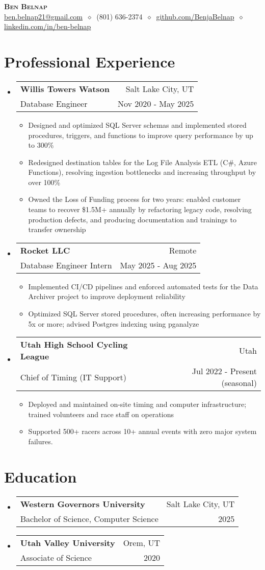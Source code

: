 \documentclass[letterpaper,11pt]{article}
\makeatletter
\newcommand{\cvitem}[1]{
  \item\small{
    {#1\vspace{-2pt}}
  }
}
\newcommand{\cvheading}[4]{
  \vspace{-2pt}\item
    \begin{tabular*}{\textwidth}[t]{l@{\extracolsep{\fill}}r}
      \textbf{#1} & #2 \\
      \small#3 & \small #4 \\
    \end{tabular*}\vspace{-7pt}
}
\newcommand{\cvheadingstart}{\begin{itemize}[leftmargin=0in, label={}]}
\newcommand{\cvheadingend}{\end{itemize}}
\newcommand{\cvitemstart}{\begin{itemize}[label=\textopenbullet]\justifying}
\newcommand{\cvitemend}{\end{itemize}\vspace{-5pt}}
\makeatother
\begin{document}
\begin{center}
  \textbf{\LARGE\scshape Ben Belnap} \\
  \vspace{1pt}\small
  \href{mailto:ben.belnap21@gmail.com}{ben.belnap21@gmail.com}
  $\ \diamond\ $ 
  (801) 636-2374
  $\ \diamond\ $
  \href{https://github.com/BenjaBelnap}{github.com/BenjaBelnap}
  $\ \diamond\ $
  \href{https://www.linkedin.com/in/ben-belnap}{linkedin.com/in/ben-belnap}
\end{center}

\section{Professional Experience}
\cvheadingstart
  \cvheading
    {Willis Towers Watson}{Salt Lake City, UT}
    {Database Engineer}{Nov 2020 - May 2025}
  \cvitemstart
  \cvitem{Designed and optimized SQL Server schemas and implemented stored procedures, triggers, and functions to improve query performance by up to 300\%}
  \cvitem{Redesigned destination tables for the Log File Analysis ETL (C\#, Azure Functions), resolving ingestion bottlenecks and increasing throughput by over 100\%}
  \cvitem{Owned the Loss of Funding process for two years: enabled customer teams to recover \$1.5M+ annually by refactoring legacy code, resolving production defects, and producing documentation and trainings to transfer ownership}
  \cvitemend

  \cvheading
    {Rocket LLC}{Remote}
    {Database Engineer Intern}{May 2025 - Aug 2025}
  \cvitemstart
  \cvitem{Implemented CI/CD pipelines and enforced automated tests for the Data Archiver project to improve deployment reliability}
  \cvitem{Optimized SQL Server stored procedures, often increasing performance by 5x or more; advised Postgres indexing using pganalyze}
  \cvitemend

  \cvheading
    {Utah High School Cycling League}{Utah}
    {Chief of Timing (IT Support)}{Jul 2022 - Present (seasonal)}
  \cvitemstart
  \cvitem{Deployed and maintained on-site timing and computer infrastructure; trained volunteers and race staff on operations}
  \cvitem{Supported 500+ racers across 10+ annual events with zero major system failures.}
  \cvitemend
\cvheadingend

\section{Education}
\cvheadingstart
  \cvheading
    {Western Governors University}{Salt Lake City, UT}
    {Bachelor of Science, Computer Science}{2025}
  \cvheading
    {Utah Valley University}{Orem, UT}
    {Associate of Science}{2020}
\cvheadingend
\end{document}
